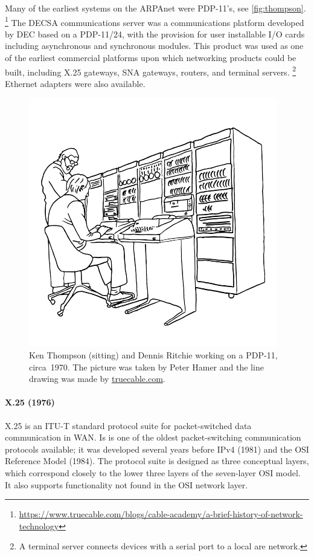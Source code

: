 {Many of the earliest systems on the ARPAnet were PDP-11's, see \vref{fig:thompson}.%
\footnote{\href{https://www.truecable.com/blogs/cable-academy/a-brief-history-of-network-technology}{https://www.truecable.com/blogs/cable-academy/a-brief-history-of-network-technology}}
The DECSA communications server was a communications platform developed by DEC based on a PDP-11/24, with the provision for user installable I/O cards including asynchronous and synchronous modules.
This product was used as one of the earliest commercial platforms upon which networking products could be built, including X.25 gateways, SNA gateways, routers, and terminal servers.%
\footnote{A terminal server connects devices with a serial port to a local are network.}
Ethernet adapters were also available.

\begin{figure}
\centering
\includegraphics[width=.5\textwidth]{images/thompson.png}
\caption{Ken Thompson (sitting) and Dennis Ritchie working on a PDP-11, circa~1970. The picture was taken by Peter Hamer and the line drawing was made by \href{https://www.truecable.com/blogs/cable-academy/a-brief-history-of-network-technology}{truecable.com}.}
\label{fig:thompson}
\end{figure}

\paragraph{X.25 (1976)}
X.25 is an ITU-T standard protocol suite for packet-switched data communication in WAN.
Is is one of the oldest packet-switching communication protocols available; it was developed several years before IPv4 (1981) and the OSI Reference Model (1984).
The protocol suite is designed as three conceptual layers, which correspond closely to the lower three layers of the seven-layer OSI model.
It also supports functionality not found in the OSI network layer.

}
